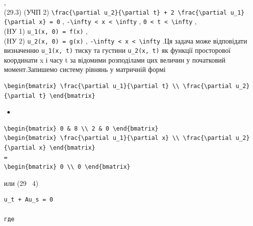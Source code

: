 \documentclass[
  ukrainian,
]{article}
\providecommand{\tightlist}{%
  \setlength{\itemsep}{0pt}\setlength{\parskip}{0pt}}
\begin{document}
,\\
(29.3) (УЧП 2)
\texttt{\textbackslash{}frac\{\textbackslash{}partial\ u\_2\}\{\textbackslash{}partial\ t\}\ +\ 2\ \textbackslash{}frac\{\textbackslash{}partial\ u\_1\}\{\textbackslash{}partial\ x\}\ =\ 0}
,
\texttt{-\textbackslash{}infty\ \textless{}\ x\ \textless{}\ \textbackslash{}infty}
, \texttt{0\ \textless{}\ t\ \textless{}\ \textbackslash{}infty} ,\\
(HУ 1) \texttt{u\_1(x,\ 0)\ =\ f(x)} ,\\
(HУ 2) \texttt{u\_2(x,\ 0)\ =\ g(x)} ,
\texttt{-\textbackslash{}infty\ \textless{}\ x\ \textless{}\ \textbackslash{}infty}
.Ця задача може відповідати визначенню \texttt{u\_1(x,\ t)} тиску та
густини \texttt{u\_2(x,\ t)} як функції просторової координати x і часу
t за відомими розподілами цих величин у початковий момент.Запишемо
систему рівнянь у матричній формі

\begin{verbatim}
\begin{bmatrix} \frac{\partial u_1}{\partial t} \\ \frac{\partial u_2}{\partial t} \end{bmatrix}
\end{verbatim}

\begin{itemize}
\tightlist
\item
\end{itemize}

\begin{verbatim}
\begin{bmatrix} 0 & 8 \\ 2 & 0 \end{bmatrix}
\begin{bmatrix} \frac{\partial u_1}{\partial x} \\ \frac{\partial u_2}{\partial x} \end{bmatrix}
=
\begin{bmatrix} 0 \\ 0 \end{bmatrix}
\end{verbatim}

или (29 ~4)

\begin{verbatim}
u_t + Au_s = 0

где
\end{verbatim}
\end{document}
